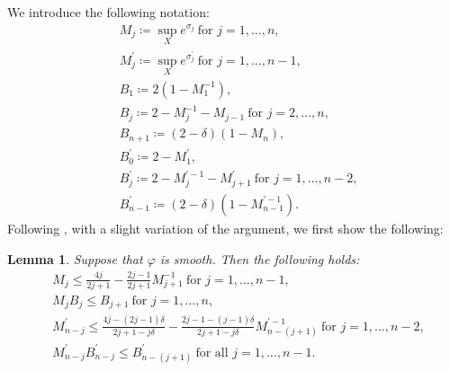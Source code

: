 \documentclass[12pt]{article}
\theoremstyle{definition}
\newtheorem{lemm}[defi]{Lemma}
\begin{document}
We introduce the following notation:
\begin{align*}
&M_j\coloneqq \sup_Xe^{\sigma_j}\ \text{for $j=1,\dots, n$}, \\
&M_j^\prime\coloneqq \sup_Xe^{\sigma_j^\prime} \ \text{for $j=1,\dots, n-1$}, \\
&B_1\coloneqq 2(1-M_1^{-1}), \\
&B_j\coloneqq 2-M_j^{-1}-M_{j-1} \ \text{for $j=2,\dots, n$}, \\
&B_{n+1}\coloneqq (2-\delta)(1-M_n), \\
&B_0^\prime\coloneqq 2-M_1^\prime, \\
&B_j^\prime\coloneqq 2-M_j^{\prime-1}-M_{j+1}^\prime \ \text{for $j=1,\dots, n-2$}, \\
&B_{n-1}^\prime\coloneqq (2-\delta)(1-M_{n-1}^{\prime-1}).
\end{align*}
Following \cite[Section 4]{LM1}, with a slight variation of the argument, we first show the following:
\begin{lemm}\label{MMBB}{\it 
Suppose that $\varphi$ is smooth. Then the following holds:
\begin{align}
&M_j \leq \frac{4j}{2j+1}-\frac{2j-1}{2j+1}M_{j+1}^{-1}\ \text{for $j=1,\dots, n-1$}, \label{M}\\
&M_j B_j\leq B_{j+1}\ \text{for $j=1,\dots, n$}, \label{MB}\\
&M_{n-j}^\prime \leq \frac{4j-(2j-1)\delta}{2j+1-j\delta}-\frac{2j-1-(j-1)\delta}{2j+1-j\delta}M_{n-(j+1)}^{\prime-1} \ \text{for $j=1,\dots, n-2$}, \label{Mp}\\
&M_{n-j}^\prime B_{n-j}^\prime \leq B_{n-(j+1)}^\prime\ \text{for all $j=1,\dots, n-1$}. \label{MpBp}
\end{align}
}
\end{lemm}
\end{document}
